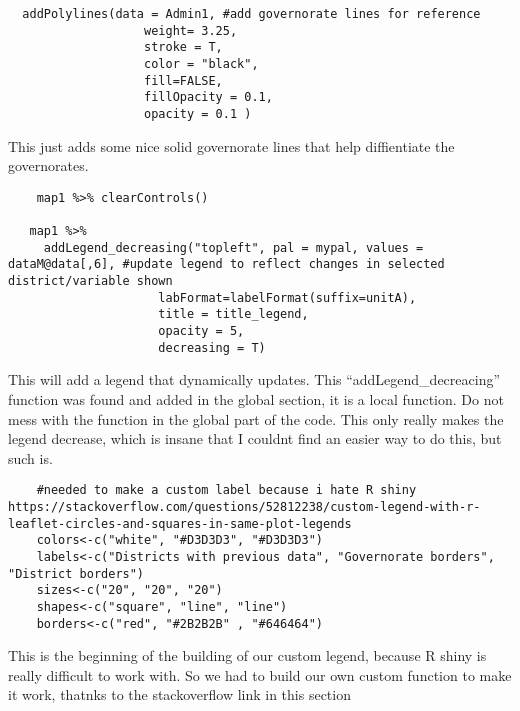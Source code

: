 \documentclass[
]{article}
\begin{document}
\begin{verbatim}
  addPolylines(data = Admin1, #add governorate lines for reference
                   weight= 3.25,
                   stroke = T,
                   color = "black",
                   fill=FALSE,
                   fillOpacity = 0.1,
                   opacity = 0.1 )
\end{verbatim}

This just adds some nice solid governorate lines that help diffientiate
the governorates.

\begin{verbatim}
    map1 %>% clearControls()
    
   map1 %>% 
     addLegend_decreasing("topleft", pal = mypal, values =  dataM@data[,6], #update legend to reflect changes in selected district/variable shown
                     labFormat=labelFormat(suffix=unitA),
                     title = title_legend,
                     opacity = 5,
                     decreasing = T) 
\end{verbatim}

This will add a legend that dynamically updates. This
``addLegend\_decreacing'' function was found and added in the global
section, it is a local function. Do not mess with the function in the
global part of the code. This only really makes the legend decrease,
which is insane that I couldnt find an easier way to do this, but such
is.

\begin{verbatim}
    #needed to make a custom label because i hate R shiny https://stackoverflow.com/questions/52812238/custom-legend-with-r-leaflet-circles-and-squares-in-same-plot-legends
    colors<-c("white", "#D3D3D3", "#D3D3D3")
    labels<-c("Districts with previous data", "Governorate borders", "District borders")
    sizes<-c("20", "20", "20")
    shapes<-c("square", "line", "line")
    borders<-c("red", "#2B2B2B" , "#646464")
\end{verbatim}

This is the beginning of the building of our custom legend, because R
shiny is really difficult to work with. So we had to build our own
custom function to make it work, thatnks to the stackoverflow link in
this section
\end{document}
